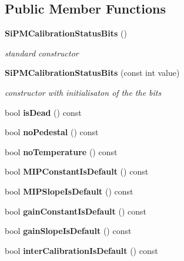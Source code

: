 \subsection*{Public Member Functions}
\begin{DoxyCompactItemize}
\item 
{\bf Si\-P\-M\-Calibration\-Status\-Bits} ()
\begin{DoxyCompactList}\small\item\em standard constructor \end{DoxyCompactList}\item 
{\bf Si\-P\-M\-Calibration\-Status\-Bits} (const int value)
\begin{DoxyCompactList}\small\item\em constructor with initialisaton of the the bits \end{DoxyCompactList}\item 
bool {\bfseries is\-Dead} () const \label{classCALICE_1_1SiPMCalibrationStatusBits_a38d41dbc2d18cc248db6b3bcbdc05097}

\item 
bool {\bfseries no\-Pedestal} () const \label{classCALICE_1_1SiPMCalibrationStatusBits_af81bc0c946d181e53c668c8d36c65c19}

\item 
bool {\bfseries no\-Temperature} () const \label{classCALICE_1_1SiPMCalibrationStatusBits_a5722766182d453eaf62b821ca72a6978}

\item 
bool {\bfseries M\-I\-P\-Constant\-Is\-Default} () const \label{classCALICE_1_1SiPMCalibrationStatusBits_a0463a7038f71cbf0ae48b955ec7653dc}

\item 
bool {\bfseries M\-I\-P\-Slope\-Is\-Default} () const \label{classCALICE_1_1SiPMCalibrationStatusBits_a4a6738b871a263f7bfc8ef6df5168ee3}

\item 
bool {\bfseries gain\-Constant\-Is\-Default} () const \label{classCALICE_1_1SiPMCalibrationStatusBits_add8c1851904732b4c45ad8889f01bc60}

\item 
bool {\bfseries gain\-Slope\-Is\-Default} () const \label{classCALICE_1_1SiPMCalibrationStatusBits_ab124476d6ad7679b2957be9ae07f5c78}

\item 
bool {\bfseries inter\-Calibration\-Is\-Default} () const \label{classCALICE_1_1SiPMCalibrationStatusBits_add519a14b1b9a8fc5b4e743f6cad492b}


\end{DoxyCompactItemize}
